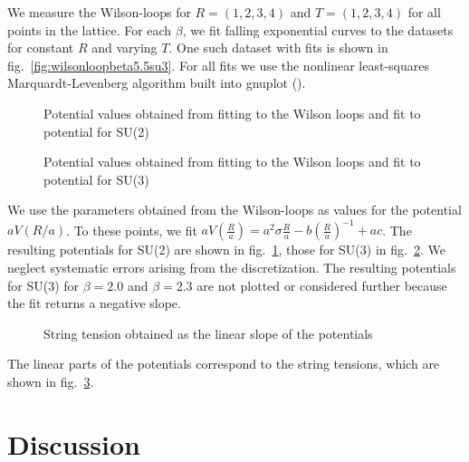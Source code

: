 \documentclass[%
 reprint,
 amsmath,amssymb,
 aps,
]{revtex4-1}
\begin{document}
We measure the Wilson-loops for $R=(1,2,3,4)$ and $T=(1,2,3,4)$ for all points in the lattice. For each $\beta$, we fit falling exponential curves to the datasets for constant $R$ and varying $T$. One such dataset with fits is shown in fig.~\ref{fig:wilsonloopbeta5.5su3}. For all fits we use the nonlinear least-squares Marquardt-Levenberg algorithm built into gnuplot (\citet{gnuplotdoc}).



\begin{figure}
	\centering
	
	\caption[Potentials obtained using SU(2)]{Potential values obtained from fitting to the Wilson loops and fit to potential for SU(2)}
	\label{fig:fittedpotentialssu2}
\end{figure} 


\begin{figure}
	\centering
	
	\caption[Potentials obtained using SU(3)]{Potential values obtained from fitting to the Wilson loops and fit to potential for SU(3)}
	\label{fig:fittedpotentialssu3}
\end{figure} 

We use the parameters obtained from the Wilson-loops as values for the potential $aV(R/a)$. To these points, we fit $aV\left(\frac{R}{a}\right)=a^2\sigma \frac{R}{a}-b\left(\frac{R}{a}\right)^{-1}+ac$. The resulting potentials for SU(2) are shown in fig.~\ref{fig:fittedpotentialssu2}, those for SU(3) in fig.~\ref{fig:fittedpotentialssu3}. We neglect systematic errors arising from the discretization. The resulting potentials for SU(3) for $\beta=2.0$ and $\beta=2.3$ are not plotted or considered further because the fit returns a negative slope.


\begin{figure}
	\centering
	
	\caption[String tension obtained from potential]{String tension obtained as the linear slope of the potentials}
	\label{fig:stringtension}
\end{figure}

The linear parts of the potentials correspond to the string tensions, which are shown in fig.~\ref{fig:stringtension}.

\section{Discussion}
\end{document}
